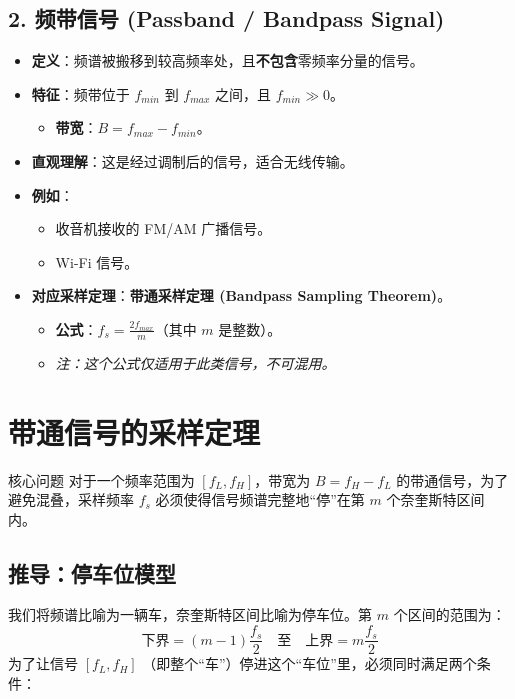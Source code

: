 \subsection{2. 频带信号 (Passband / Bandpass Signal)}
\begin{itemize}
    \item \textbf{定义}：频谱被搬移到较高频率处，且\textbf{不包含}零频率分量的信号。
    \item \textbf{特征}：频带位于 $f_{min}$ 到 $f_{max}$ 之间，且 $f_{min} \gg 0$。
    \begin{itemize}
        \item \textbf{带宽}：$B = f_{max} - f_{min}$。
    \end{itemize}
    \item \textbf{直观理解}：这是经过调制后的信号，适合无线传输。
    \item \textbf{例如}：
    \begin{itemize}
        \item 收音机接收的 FM/AM 广播信号。
        \item Wi-Fi 信号。
    \end{itemize}
    \item \textbf{对应采样定理}：\textbf{带通采样定理 (Bandpass Sampling Theorem)}。
    \begin{itemize}
        \item \textbf{公式}：$f_s = \frac{2f_{max}}{m}$（其中 $m$ 是整数）。
        \item \textit{注：这个公式仅适用于此类信号，不可混用。}
    \end{itemize}
\end{itemize}

\section{带通信号的采样定理}

\begin{corebox}{核心问题}
    对于一个频率范围为 $[f_L, f_H]$，带宽为 $B = f_H - f_L$ 的带通信号，为了避免混叠，采样频率 $f_s$ 必须使得信号频谱完整地“停”在第 $m$ 个奈奎斯特区间内。
\end{corebox}

\subsection{推导：停车位模型}
我们将频谱比喻为一辆车，奈奎斯特区间比喻为停车位。第 $m$ 个区间的范围为：
\[
\text{下界} = (m-1)\frac{f_s}{2} \quad \text{至} \quad \text{上界} = m\frac{f_s}{2}
\]
为了让信号 $[f_L, f_H]$ （即整个“车”）停进这个“车位”里，必须同时满足两个条件：

